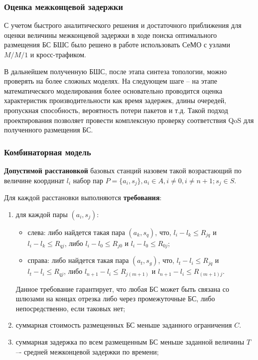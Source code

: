 \begin{frame}
    \justifying
    \frametitle{Оценка межконцевой задержки}
    \fontsize{8pt}{7.2}\selectfont

    С учетом быстрого аналитического решения и достаточного приближения для оценки величины межконцевой задержки в ходе поиска оптимального размещения БС БШС было решено в работе использовать СеМО с узлами $M/M/1$ и кросс-трафиком.

    \bigskip
    В дальнейшем полученную БШС, после этапа синтеза топологии, можно проверять на более сложных моделях. На следующем шаге -- на этапе математического моделирования более основательно проводится оценка характеристик производительности как время задержек, длины очередей, пропускная способность, вероятность потери пакетов и т.д. Такой подход проектирования позволяет провести комплексную проверку соответствия QoS для полученного размещения БС. 
    
    \bigskip


\end{frame}

\begin{frame}
    \frametitle{Комбинаторная модель}
    \justifying
    \textbf{Допустимой расстановкой} базовых станций назовем такой возрастающий по величине координат $l_i$  набор пар $P = \{a_i, s_j\},a_i \in A,i \neq 0,i \neq n+1;s_j \in S$.

    Для каждой расстановки выполняются \textbf{требования}:

    \begin{enumerate}
        \item  для каждой пары $(a_i,s_j)$:
            \begin{itemize}
                \item слева: либо найдется такая пара $(a_k,s_q)$, что, $l_i - l_k \leqslant R_{jq}$  и $l_i - l_k  \leqslant R_{qj}$, либо $l_i-l_0 \leqslant R_{j0}$ и $l_i - l_0 \leqslant R_{0j}$;
                \item справа: либо найдется такая пара $(a_t,s_g)$, что, $l_t-l_i \leqslant R_{jq}$ и $l_t - l_i \leqslant R_{qj}$, либо $l_{n+1}-l_i \leqslant R_{j(m+1)}$ и $l_{n+1}-l_i \leqslant R_{(m+1)j}$. 
            \end{itemize}
    Данное требование гарантирует, что любая БС может быть связана со шлюзами на концах отрезка либо через промежуточные БС, либо непосредственно, если таковых нет;
        \item суммарная стоимость размещенных БС меньше заданного ограничения  $C$.
        \item суммарная задержка по всем размещенным БС меньше заданной величины $T$ –- средней межконцевой задержки по времени;
    \end{enumerate}

\end{frame}

